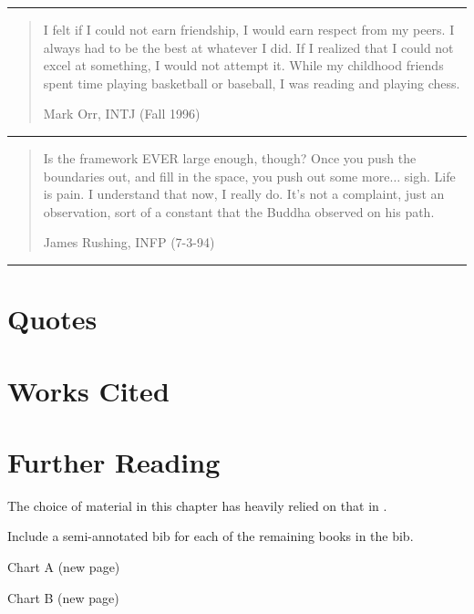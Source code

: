 \noindent\rule{\linewidth}{1pt}

\begin{quotation}
	I felt if I could not earn friendship, I would earn respect from my peers. I always had to be the best at whatever I did. If I realized that I could not excel at something, I would not attempt it. While my childhood friends spent time playing basketball or baseball, I was reading and playing chess.
\begin{flushright}
	Mark Orr, INTJ (Fall 1996)
\end{flushright}
\end{quotation}

\noindent\rule{\linewidth}{1pt}

\begin{quotation}
	Is the framework EVER large enough, though? Once you push the boundaries out, and fill in the space, you push out some more$\ldots$ sigh. Life is pain. I understand that now, I really do. It's not a complaint, just an observation, sort of a constant that the Buddha observed on his path.
\begin{flushright}
	James Rushing, INFP (7-3-94)
\end{flushright}
\end{quotation}

\noindent\rule{\linewidth}{1pt}

\section{Quotes}

\section{Works Cited}

\section{Further Reading}

The choice of material in this chapter has heavily relied on that in \cite{Prov:87,MBTI:HHB:06,MBTI:HHB:02,Mar:95}.

Include a semi-annotated bib for each of the remaining books in the bib.

Chart A (new page)

Chart B (new page)


